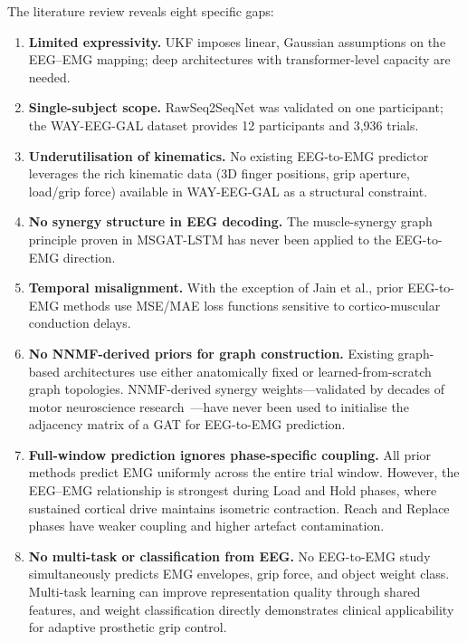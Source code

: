 \documentclass[12pt, a4paper]{article}
\begin{document}
	The literature review reveals eight specific gaps:
	
	\begin{enumerate}[label=\textbf{G\arabic*.}, leftmargin=*, itemsep=4pt]
		\item \textbf{Limited expressivity.} UKF imposes linear, Gaussian
		assumptions on the EEG--EMG mapping; deep architectures with
		transformer-level capacity are needed.
		\item \textbf{Single-subject scope.} RawSeq2SeqNet was validated on one
		participant; the WAY-EEG-GAL dataset provides 12 participants and 3,936
		trials.
		\item \textbf{Underutilisation of kinematics.} No existing EEG-to-EMG
		predictor leverages the rich kinematic data (3D finger positions, grip
		aperture, load/grip force) available in WAY-EEG-GAL as a structural
		constraint.
		\item \textbf{No synergy structure in EEG decoding.} The muscle-synergy
		graph principle proven in MSGAT-LSTM has never been applied to the
		EEG-to-EMG direction.
		\item \textbf{Temporal misalignment.} With the exception of Jain et al.,
		prior EEG-to-EMG methods use MSE/MAE loss functions sensitive to
		cortico-muscular conduction delays.
		\item \textbf{No NNMF-derived priors for graph construction.} Existing
		graph-based architectures use either anatomically fixed or learned-from-scratch
		graph topologies. NNMF-derived synergy weights---validated by decades of
		motor neuroscience research~\cite{tresch2006, pierella2020}---have
		never been used to initialise the adjacency matrix of a GAT for
		EEG-to-EMG prediction.
		\item \textbf{Full-window prediction ignores phase-specific coupling.}
		All prior methods predict EMG uniformly across the entire trial window.
		However, the EEG--EMG relationship is strongest during Load and Hold
		phases, where sustained cortical drive maintains isometric contraction.
		Reach and Replace phases have weaker coupling and higher artefact
		contamination.
		\item \textbf{No multi-task or classification from EEG.} No EEG-to-EMG
		study simultaneously predicts EMG envelopes, grip force, and object
		weight class. Multi-task learning can improve representation quality
		through shared features, and weight classification directly demonstrates
		clinical applicability for adaptive prosthetic grip control.
	\end{enumerate}
	
\end{document}
